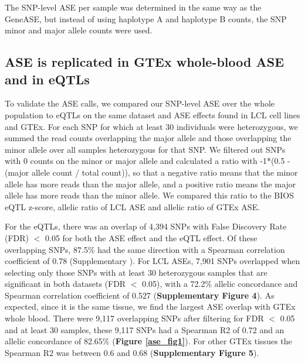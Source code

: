 The SNP-level ASE per sample was determined in the same way as the GeneASE, but instead of using haplotype A and haplotype B counts, the SNP minor and major allele counts were used.

\subsection{ASE is replicated in GTEx whole-blood ASE and in eQTLs}
To validate the ASE calls, we compared our SNP-level ASE over the whole population to eQTLs on the same dataset and ASE effects found in LCL cell lines\cite{deelenCallingGenotypesPublic2015} and GTEx\cite{pirinenAssessingAllelespecificExpression2015}. For each SNP for which at least 30 individuals were heterozygous, we summed the read counts overlapping the major allele and those overlapping the minor allele over all samples heterozygous for that SNP. We filtered out SNPs with 0 counts on the minor or major allele and calculated a ratio with -1*(0.5 - (major allele count / total count)), so that a negative ratio means that the minor allele has more reads than the major allele, and a positive ratio means the major allele has more reads than the minor allele. We compared this ratio to the BIOS eQTL z-score, allelic ratio of LCL ASE and allelic ratio of GTEx ASE. 

For the eQTLs, there was an overlap of 4,394 SNPs with False Discovery Rate (FDR) $<$ 0.05 for both the ASE effect and the eQTL effect. Of these overlapping SNPs, 87.5\% had the same direction with a Spearman correlation coefficient of 0.78 (Supplementary ). For LCL ASEs, 7,901 SNPs overlapped when selecting only those SNPs with at least 30 heterozygous samples that are significant in both datasets (FDR $<$ 0.05), with a 72.2\% allelic concordance and Spearman correlation coefficient of 0.527 (\textbf{Supplementary Figure 4}). As expected, since it is the same tissue, we find the largest ASE overlap with GTEx whole blood. There were 9,117 overlapping SNPs after filtering for FDR $<$ 0.05 and at least 30 samples, these 9,117 SNPs had a Spearman R2 of 0.72 and an allelic concordance of 82.65\% (\textbf{Figure \ref{ase_fig1}}). For other GTEx tissues the Spearman R2 was between 0.6 and 0.68 (\textbf{Supplementary Figure 5}).


